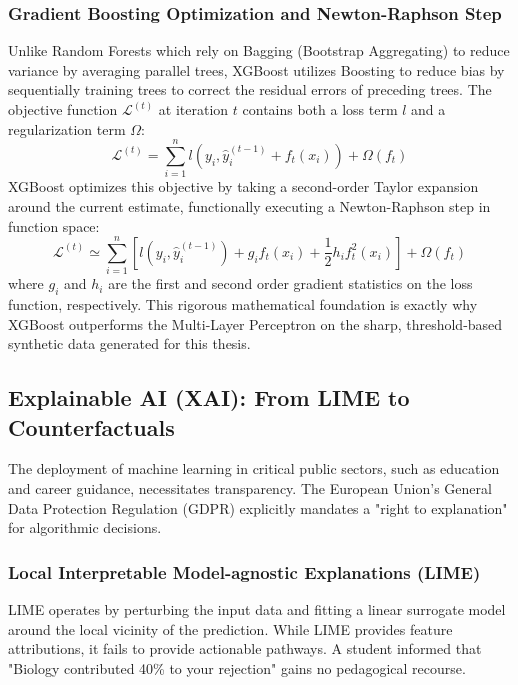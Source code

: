 \subsubsection{Gradient Boosting Optimization and Newton-Raphson Step}
Unlike Random Forests which rely on Bagging (Bootstrap Aggregating) to reduce variance by averaging parallel trees, XGBoost \parencite{chen2016xgboost} utilizes Boosting to reduce bias by sequentially training trees to correct the residual errors of preceding trees. The objective function $\mathcal{L}^{(t)}$ at iteration $t$ contains both a loss term $l$ and a regularization term $\Omega$:
\begin{equation}
    \mathcal{L}^{(t)} = \sum_{i=1}^n l(y_i, \hat{y}_i^{(t-1)} + f_t(x_i)) + \Omega(f_t)
\end{equation}
XGBoost optimizes this objective by taking a second-order Taylor expansion around the current estimate, functionally executing a Newton-Raphson step in function space:
\begin{equation}
    \mathcal{L}^{(t)} \simeq \sum_{i=1}^n \left[ l(y_i, \hat{y}_i^{(t-1)}) + g_i f_t(x_i) + \frac{1}{2} h_i f_t^2(x_i) \right] + \Omega(f_t)
\end{equation}
where $g_i$ and $h_i$ are the first and second order gradient statistics on the loss function, respectively. This rigorous mathematical foundation is exactly why XGBoost \parencite{chen2016xgboost} outperforms the Multi-Layer Perceptron \parencite{zhang2013review} on the sharp, threshold-based synthetic data generated for this thesis.

\subsection{Explainable AI (XAI): From LIME \parencite{lundberg2017unified} to Counterfactuals}
The deployment of machine learning in critical public sectors, such as education and career guidance, necessitates transparency. The European Union's General Data Protection Regulation (GDPR) explicitly mandates a "right to explanation" for algorithmic decisions. 

\subsubsection{Local Interpretable Model-agnostic Explanations (LIME)}
LIME operates by perturbing the input data and fitting a linear surrogate model around the local vicinity of the prediction. While LIME \parencite{lundberg2017unified} provides feature attributions, it fails to provide actionable pathways. A student informed that "Biology contributed 40\% to your rejection" gains no pedagogical recourse.

